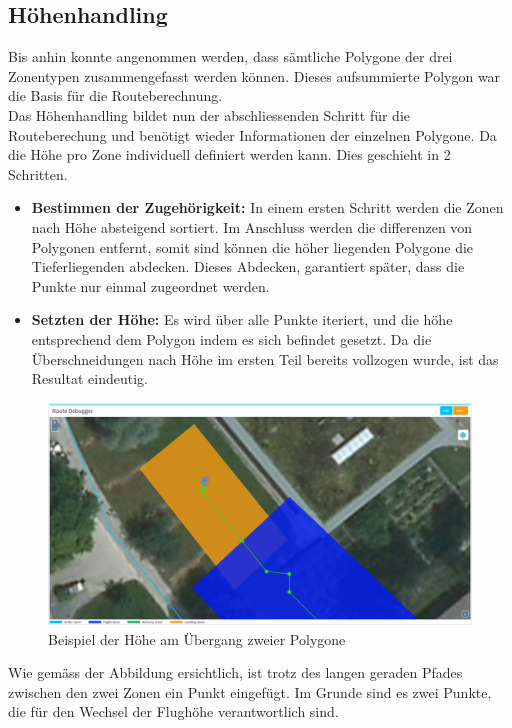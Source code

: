 \subsection{Höhenhandling}
Bis anhin konnte angenommen werden, dass sämtliche Polygone der drei Zonentypen zusammengefasst werden können. Dieses aufsummierte Polygon war die Basis für die Routeberechnung. \\
Das Höhenhandling bildet nun der abschliessenden Schritt für die Routeberechung und benötigt wieder Informationen der einzelnen Polygone. Da die Höhe pro Zone individuell definiert werden kann. Dies geschieht in 2 Schritten.
\begin{itemize}
	\item{\textbf{Bestimmen der Zugehörigkeit:} In einem ersten Schritt werden die Zonen nach Höhe absteigend sortiert. Im Anschluss werden die differenzen von Polygonen entfernt, somit sind können die höher liegenden Polygone die Tieferliegenden abdecken. Dieses Abdecken, garantiert später, dass die Punkte nur einmal zugeordnet werden.}
	\item{\textbf{Setzten der Höhe:} Es wird über alle Punkte iteriert, und die höhe entsprechend dem Polygon indem es sich befindet gesetzt. Da die Überschneidungen nach Höhe im ersten Teil bereits vollzogen wurde, ist das Resultat eindeutig.}
\end{itemize}
\begin{figure}[h]
	\centering
	\includegraphics[width=1.0\textwidth]{images/routing/height_example.png}
	\caption{Beispiel der Höhe am Übergang zweier Polygone}
	\label{fig:polygon-border-example}
\end{figure}
Wie gemäss der Abbildung ersichtlich, ist trotz des langen geraden Pfades zwischen den zwei Zonen ein Punkt eingefügt. Im Grunde sind es zwei Punkte, die für den Wechsel der Flughöhe verantwortlich sind.
\newpage
